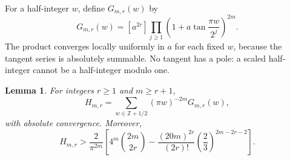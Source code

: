 \documentclass[11pt,a4paper]{article}
\newtheorem{lemma}[theorem]{Lemma}
\theoremstyle{remark}\newtheorem*{ednote}{Editorial note (ProveIt, 2026-10-01)}
\newcommand{\Z}{\mathbb Z}\newcommand{\E}{\mathcal E}
\begin{document}
For a half-integer $w$, define $G_{m,r}(w)$ by
\begin{equation}\label{eq:G}
 G_{m,r}(w)=[a^{2r}]
  \prod_{j\ge1}\left(1+a\tan\frac{\pi w}{2^j}\right)^{2m}.
\end{equation}
The product converges locally uniformly in $a$ for each fixed $w$, because the tangent series is absolutely summable. No tangent has a pole: a scaled half-integer cannot be a half-integer modulo one.

\begin{lemma}\label{lem:orbit}
For integers $r\ge1$ and $m\ge r+1$,
\begin{equation}\label{eq:orbit}
 H_{m,r}=\sum_{w\in\Z+1/2}(\pi w)^{-2m}G_{m,r}(w),
\end{equation}
with absolute convergence. Moreover,
\begin{equation}\label{eq:bound}
 H_{m,r}>\frac{2}{\pi^{2m}}
 \left[
 4^m\binom{2m}{2r}
 -\frac{(20m)^{2r}}{(2r)!}
      \left(\frac23\right)^{2m-2r-2}
 \right].
\end{equation}
\end{lemma}
\end{document}
